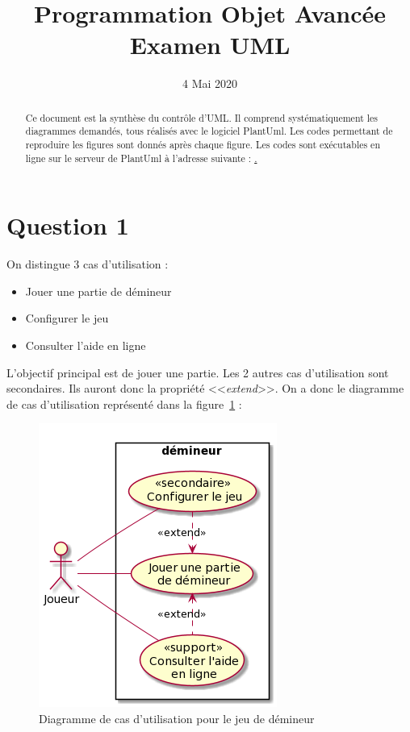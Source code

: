 \documentclass[a4paper,12pt]{article}
\title{Programmation Objet Avancée \\ Examen UML}
\author{ }
\date{4 Mai 2020}
\begin{document}
\maketitle
\begin{abstract}
    Ce document est la synthèse du contrôle d'UML. Il comprend systématiquement les diagrammes demandés, tous réalisés avec le logiciel PlantUml. Les codes permettant de reproduire les figures sont donnés après chaque figure. Les codes sont exécutables en ligne sur le serveur de PlantUml à l'adresse suivante : \href{http://www.plantuml.com/plantuml/uml/}.
\end{abstract}

\tableofcontents
\clearpage
\listoffigures
\listoflistings
\clearpage

\section{Question 1}\label{question-1}

On distingue 3 cas d'utilisation :
\begin{itemize}
    \item Jouer une partie de démineur
    \item Configurer le jeu
    \item Consulter l'aide en ligne
\end{itemize}

L'objectif principal est de jouer une partie. Les 2 autres cas d'utilisation sont secondaires.
Ils auront donc la propriété <<\emph{extend}>>. On a donc le diagramme de cas d'utilisation représenté dans la figure~\ref{fig:utilisation} :


\begin{figure}[htbp]
    \centering
    \includegraphics[width=.5\textwidth]{./images/q1.png}
    \caption{Diagramme de cas d'utilisation pour le jeu de démineur}
    \label{fig:utilisation}
\end{figure}
\end{document}
